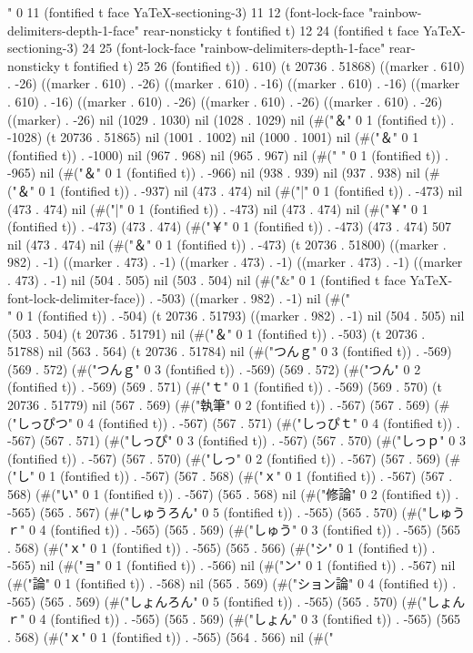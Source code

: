 " 0 11 (fontified t face YaTeX-sectioning-3) 11 12 (font-lock-face "rainbow-delimiters-depth-1-face" rear-nonsticky t fontified t) 12 24 (fontified t face YaTeX-sectioning-3) 24 25 (font-lock-face "rainbow-delimiters-depth-1-face" rear-nonsticky t fontified t) 25 26 (fontified t)) . 610) (t 20736 . 51868) ((marker . 610) . -26) ((marker . 610) . -26) ((marker . 610) . -16) ((marker . 610) . -16) ((marker . 610) . -16) ((marker . 610) . -26) ((marker . 610) . -26) ((marker . 610) . -26) ((marker) . -26) nil (1029 . 1030) nil (1028 . 1029) nil (#("＆" 0 1 (fontified t)) . -1028) (t 20736 . 51865) nil (1001 . 1002) nil (1000 . 1001) nil (#("＆" 0 1 (fontified t)) . -1000) nil (967 . 968) nil (965 . 967) nil (#(" " 0 1 (fontified t)) . -965) nil (#("＆" 0 1 (fontified t)) . -966) nil (938 . 939) nil (937 . 938) nil (#("＆" 0 1 (fontified t)) . -937) nil (473 . 474) nil (#("|" 0 1 (fontified t)) . -473) nil (473 . 474) nil (#("|" 0 1 (fontified t)) . -473) nil (473 . 474) nil (#("￥" 0 1 (fontified t)) . -473) (473 . 474) (#("￥" 0 1 (fontified t)) . -473) (473 . 474) 507 nil (473 . 474) nil (#("＆" 0 1 (fontified t)) . -473) (t 20736 . 51800) ((marker . 982) . -1) ((marker . 473) . -1) ((marker . 473) . -1) ((marker . 473) . -1) ((marker . 473) . -1) nil (504 . 505) nil (503 . 504) nil (#("&" 0 1 (fontified t face YaTeX-font-lock-delimiter-face)) . -503) ((marker . 982) . -1) nil (#("\\" 0 1 (fontified t)) . -504) (t 20736 . 51793) ((marker . 982) . -1) nil (504 . 505) nil (503 . 504) (t 20736 . 51791) nil (#("＆" 0 1 (fontified t)) . -503) (t 20736 . 51788) nil (563 . 564) (t 20736 . 51784) nil (#("つんｇ" 0 3 (fontified t)) . -569) (569 . 572) (#("つんｇ" 0 3 (fontified t)) . -569) (569 . 572) (#("つん" 0 2 (fontified t)) . -569) (569 . 571) (#("ｔ" 0 1 (fontified t)) . -569) (569 . 570) (t 20736 . 51779) nil (567 . 569) (#("執筆" 0 2 (fontified t)) . -567) (567 . 569) (#("しっぴつ" 0 4 (fontified t)) . -567) (567 . 571) (#("しっぴｔ" 0 4 (fontified t)) . -567) (567 . 571) (#("しっぴ" 0 3 (fontified t)) . -567) (567 . 570) (#("しっｐ" 0 3 (fontified t)) . -567) (567 . 570) (#("しっ" 0 2 (fontified t)) . -567) (567 . 569) (#("し" 0 1 (fontified t)) . -567) (567 . 568) (#("ｘ" 0 1 (fontified t)) . -567) (567 . 568) (#("い" 0 1 (fontified t)) . -567) (565 . 568) nil (#("修論" 0 2 (fontified t)) . -565) (565 . 567) (#("しゅうろん" 0 5 (fontified t)) . -565) (565 . 570) (#("しゅうｒ" 0 4 (fontified t)) . -565) (565 . 569) (#("しゅう" 0 3 (fontified t)) . -565) (565 . 568) (#("ｘ" 0 1 (fontified t)) . -565) (565 . 566) (#("シ" 0 1 (fontified t)) . -565) nil (#("ョ" 0 1 (fontified t)) . -566) nil (#("ン" 0 1 (fontified t)) . -567) nil (#("論" 0 1 (fontified t)) . -568) nil (565 . 569) (#("ション論" 0 4 (fontified t)) . -565) (565 . 569) (#("しょんろん" 0 5 (fontified t)) . -565) (565 . 570) (#("しょんｒ" 0 4 (fontified t)) . -565) (565 . 569) (#("しょん" 0 3 (fontified t)) . -565) (565 . 568) (#("ｘ" 0 1 (fontified t)) . -565) (564 . 566) nil (#("
